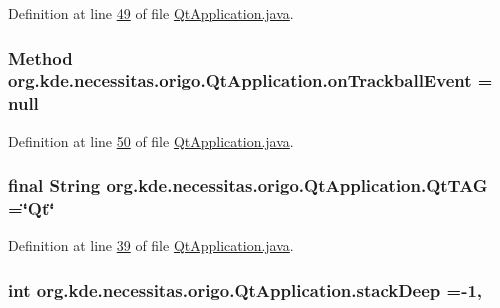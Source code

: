 Definition at line \hyperlink{_qt_application_8java_source_l00049}{49} of file \hyperlink{_qt_application_8java_source}{Qt\-Application.\-java}.

\hypertarget{classorg_1_1kde_1_1necessitas_1_1origo_1_1_qt_application_aa3d5068cdf9e6a4a3163e3810908fef7}{
\subsubsection[{on\-Trackball\-Event}]{\setlength{\rightskip}{0pt plus 5cm}Method org.\-kde.\-necessitas.\-origo.\-Qt\-Application.\-on\-Trackball\-Event = null\hspace{0.3cm}{\ttfamily [static]}}}\label{d0/da0/classorg_1_1kde_1_1necessitas_1_1origo_1_1_qt_application_aa3d5068cdf9e6a4a3163e3810908fef7}


Definition at line \hyperlink{_qt_application_8java_source_l00050}{50} of file \hyperlink{_qt_application_8java_source}{Qt\-Application.\-java}.

\hypertarget{classorg_1_1kde_1_1necessitas_1_1origo_1_1_qt_application_ad954a272f4a3259ceebc0b0a3d85dd82}{
\subsubsection[{Qt\-T\-A\-G}]{\setlength{\rightskip}{0pt plus 5cm}final String org.\-kde.\-necessitas.\-origo.\-Qt\-Application.\-Qt\-T\-A\-G =\char`\"{}Qt\char`\"{}\hspace{0.3cm}{\ttfamily [static]}}}\label{d0/da0/classorg_1_1kde_1_1necessitas_1_1origo_1_1_qt_application_ad954a272f4a3259ceebc0b0a3d85dd82}


Definition at line \hyperlink{_qt_application_8java_source_l00039}{39} of file \hyperlink{_qt_application_8java_source}{Qt\-Application.\-java}.

\hypertarget{classorg_1_1kde_1_1necessitas_1_1origo_1_1_qt_application_ab072f0cec7e921c7decb2aa1d532fea3}{
\subsubsection[{stack\-Deep}]{\setlength{\rightskip}{0pt plus 5cm}int org.\-kde.\-necessitas.\-origo.\-Qt\-Application.\-stack\-Deep =-\/1\hspace{0.3cm}{\ttfamily [static]}, {\ttfamily [private]}}}\label{d0/da0/classorg_1_1kde_1_1necessitas_1_1origo_1_1_qt_application_ab072f0cec7e921c7decb2aa1d532fea3}


